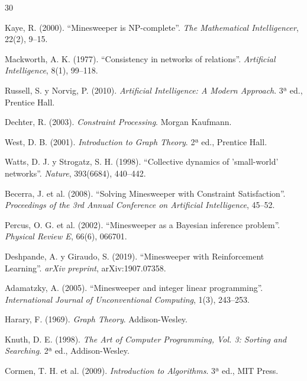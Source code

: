 \documentclass[12pt,a4paper]{article}
\begin{document}
\begin{thebibliography}{30}

Kaye, R. (2000). ``Minesweeper is NP-complete''. \textit{The Mathematical Intelligencer}, 22(2), 9--15.

Mackworth, A. K. (1977). ``Consistency in networks of relations''. \textit{Artificial Intelligence}, 8(1), 99--118.

Russell, S. y Norvig, P. (2010). \textit{Artificial Intelligence: A Modern Approach}. 3ª ed., Prentice Hall.

Dechter, R. (2003). \textit{Constraint Processing}. Morgan Kaufmann.

West, D. B. (2001). \textit{Introduction to Graph Theory}. 2ª ed., Prentice Hall.

Watts, D. J. y Strogatz, S. H. (1998). ``Collective dynamics of 'small-world' networks''. \textit{Nature}, 393(6684), 440--442.

Becerra, J. et al. (2008). ``Solving Minesweeper with Constraint Satisfaction''. \textit{Proceedings of the 3rd Annual Conference on Artificial Intelligence}, 45--52.

Percus, O. G. et al. (2002). ``Minesweeper as a Bayesian inference problem''. \textit{Physical Review E}, 66(6), 066701.

Deshpande, A. y Giraudo, S. (2019). ``Minesweeper with Reinforcement Learning''. \textit{arXiv preprint}, arXiv:1907.07358.

Adamatzky, A. (2005). ``Minesweeper and integer linear programming''. \textit{International Journal of Unconventional Computing}, 1(3), 243--253.

Harary, F. (1969). \textit{Graph Theory}. Addison-Wesley.

Knuth, D. E. (1998). \textit{The Art of Computer Programming, Vol. 3: Sorting and Searching}. 2ª ed., Addison-Wesley.

Cormen, T. H. et al. (2009). \textit{Introduction to Algorithms}. 3ª ed., MIT Press.


\end{thebibliography}
\end{document}
